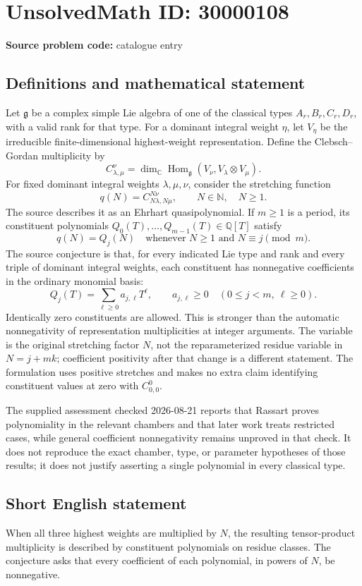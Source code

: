 \documentclass[11pt]{article}
\newcommand{\N}{\mathbb{N}}
\newcommand{\Q}{\mathbb{Q}}
\newcommand{\C}{\mathbb{C}}
\begin{document}
\section*{UnsolvedMath ID: 30000108}
\textbf{Source problem code:} catalogue entry
\subsection{Definitions and mathematical statement}
Let \(\mathfrak g\) be a complex simple Lie algebra of one of the classical types \(A_r,B_r,C_r,D_r\), with a valid rank for that type. For a dominant integral weight \(\eta\), let \(V_\eta\) be the irreducible finite-dimensional highest-weight representation. Define the Clebsch--Gordan multiplicity by
\[
C_{\lambda,\mu}^{\nu}=\dim_{\C}\operatorname{Hom}_{\mathfrak g}(V_\nu,V_\lambda\otimes V_\mu).
\]
For fixed dominant integral weights \(\lambda,\mu,\nu\), consider the stretching function
\[
q(N)=C_{N\lambda,N\mu}^{N\nu},\qquad N\in\N,\quad N\geq1.
\]
The source describes it as an Ehrhart quasipolynomial. If \(m\geq1\) is a period, its constituent polynomials \(Q_0(T),\ldots,Q_{m-1}(T)\in\Q[T]\) satisfy
\[
q(N)=Q_j(N)\quad\text{whenever }N\geq1\text{ and }N\equiv j\pmod m.
\]
The source conjecture is that, for every indicated Lie type and rank and every triple of dominant integral weights, each constituent has nonnegative coefficients in the ordinary monomial basis:
\[
Q_j(T)=\sum_{\ell\geq0}a_{j,\ell}T^\ell,
\qquad a_{j,\ell}\geq0\quad(0\leq j<m,\ \ell\geq0).
\]
Identically zero constituents are allowed. This is stronger than the automatic nonnegativity of representation multiplicities at integer arguments. The variable is the original stretching factor \(N\), not the reparameterized residue variable in \(N=j+mk\); coefficient positivity after that change is a different statement. The formulation uses positive stretches and makes no extra claim identifying constituent values at zero with \(C_{0,0}^{0}\).

The supplied assessment checked 2026-08-21 reports that Rassart proves polynomiality in the relevant chambers and that later work treats restricted cases, while general coefficient nonnegativity remains unproved in that check. It does not reproduce the exact chamber, type, or parameter hypotheses of those results; it does not justify asserting a single polynomial in every classical type.
\subsection{Short English statement}
When all three highest weights are multiplied by \(N\), the resulting tensor-product multiplicity is described by constituent polynomials on residue classes. The conjecture asks that every coefficient of each polynomial, in powers of \(N\), be nonnegative.
\end{document}
